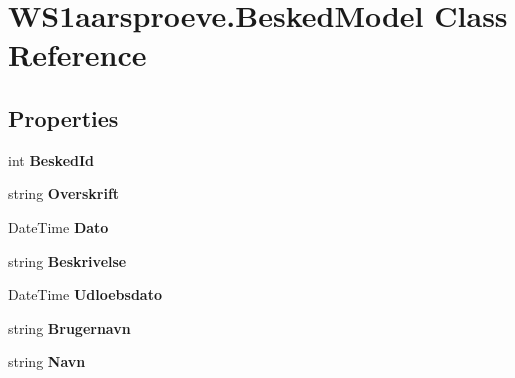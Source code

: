\hypertarget{class_w_s1aarsproeve_1_1_besked_model}{}\section{W\+S1aarsproeve.\+Besked\+Model Class Reference}
\label{class_w_s1aarsproeve_1_1_besked_model}
\subsection*{Properties}
\begin{DoxyCompactItemize}
\item 
\hypertarget{class_w_s1aarsproeve_1_1_besked_model_a594b8fc6bc155441bda7962e6c5a4467}{}int {\bfseries Besked\+Id}\label{class_w_s1aarsproeve_1_1_besked_model_a594b8fc6bc155441bda7962e6c5a4467}

\item 
\hypertarget{class_w_s1aarsproeve_1_1_besked_model_a252678f57975b5973ebdc5eb516547bb}{}string {\bfseries Overskrift}\label{class_w_s1aarsproeve_1_1_besked_model_a252678f57975b5973ebdc5eb516547bb}

\item 
\hypertarget{class_w_s1aarsproeve_1_1_besked_model_a3c9200c14b8eb872ea61c3674e644d36}{}Date\+Time {\bfseries Dato}\label{class_w_s1aarsproeve_1_1_besked_model_a3c9200c14b8eb872ea61c3674e644d36}

\item 
\hypertarget{class_w_s1aarsproeve_1_1_besked_model_ad76e6cd664bf28ecaa47bda39ace133d}{}string {\bfseries Beskrivelse}\label{class_w_s1aarsproeve_1_1_besked_model_ad76e6cd664bf28ecaa47bda39ace133d}

\item 
\hypertarget{class_w_s1aarsproeve_1_1_besked_model_ace6ee14bceebe2314ef4bc68a93d3128}{}Date\+Time {\bfseries Udloebsdato}\label{class_w_s1aarsproeve_1_1_besked_model_ace6ee14bceebe2314ef4bc68a93d3128}

\item 
\hypertarget{class_w_s1aarsproeve_1_1_besked_model_adfefcfb028518dc82f915b2b313e458a}{}string {\bfseries Brugernavn}\label{class_w_s1aarsproeve_1_1_besked_model_adfefcfb028518dc82f915b2b313e458a}

\item 
\hypertarget{class_w_s1aarsproeve_1_1_besked_model_a09f8c37e0488fde83af3d5bf27f8bca5}{}string {\bfseries Navn}\label{class_w_s1aarsproeve_1_1_besked_model_a09f8c37e0488fde83af3d5bf27f8bca5}

\end{DoxyCompactItemize}


